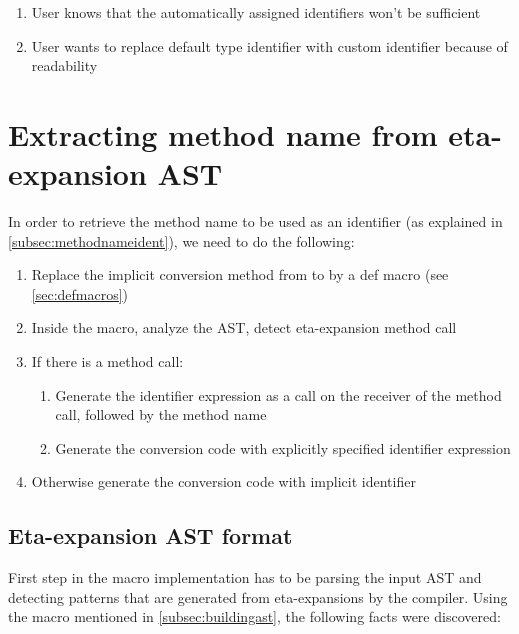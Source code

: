\begin{enumerate}
	\item User knows that the automatically assigned identifiers won't be sufficient
	\item User wants to replace default type identifier with custom identifier because of readability
\end{enumerate}


\section{Extracting method name from eta-expansion AST}

In order to retrieve the method name to be used as an identifier (as explained in \ref{subsec:methodnameident}), we need to do the following:

\begin{enumerate}
	\item Replace the implicit conversion method from  to  by a def macro (see \ref{sec:defmacros})
	\item Inside the macro, analyze the AST, detect eta-expansion method call
	\item If there is a method call:
	\begin{enumerate}
		\item Generate the identifier expression as a  call on the receiver of the method call, followed by the method name
		\item Generate the conversion code with explicitly specified identifier expression
	\end{enumerate}
	\item Otherwise generate the conversion code with implicit identifier	
\end{enumerate}

\subsection{Eta-expansion AST format}

First step in the macro implementation has to be parsing the input AST and detecting patterns that are generated from eta-expansions by the compiler. Using the  macro mentioned in \ref{subsec:buildingast}, the following facts were discovered:

